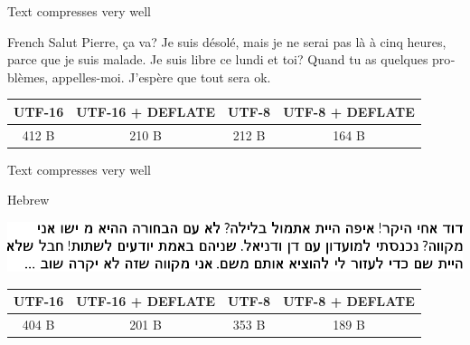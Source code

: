 \documentclass{beamer}
\newcommand{\txtTextCompression}{Text compresses very well}
\newcommand{\verticalspace}{\vspace{10pt}}
\begin{document}
%
%	

\begin{frame}{\txtTextCompression}
	\begin{exampleblock}{French}
		\foreignlanguage{french}{Salut Pierre, {\c c}a va? Je suis désolé, mais je ne serai pas là à cinq heures, parce que je suis malade. Je suis libre ce lundi et toi? Quand tu as quelques problèmes, appelles-moi. J'espère que tout sera ok.}

		\verticalspace
		\centering
		\begin{tabular}{ |c|c|c|c| }
			\hline
			UTF-16 & UTF-16 + DEFLATE & UTF-8 & UTF-8 + DEFLATE \\
			\hline
			412 B & 210 B & 212 B & 164 B \\
			\hline
		\end{tabular}
	\end{exampleblock}
\end{frame}

\begin{frame}{\txtTextCompression}
	\begin{exampleblock}{Hebrew}
		\begin{flushright}
			\includegraphics[width=\textwidth]{hebrew}
		\end{flushright}
		\centering
		\begin{tabular}{ |c|c|c|c| }
			\hline
			UTF-16 & UTF-16 + DEFLATE & UTF-8 & UTF-8 + DEFLATE \\
			\hline
			404 B & 201 B & 353 B & 189 B \\
			\hline
		\end{tabular}
	\end{exampleblock}
\end{frame}
\end{document}
